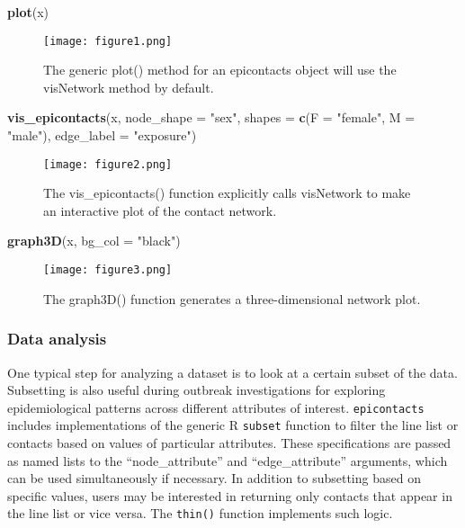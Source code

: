 \documentclass[9pt,a4paper,]{extarticle}
\newenvironment{Shaded}{\begin{snugshade}}{\end{snugshade}}
\newcommand{\KeywordTok}[1]{\textcolor[rgb]{0.13,0.29,0.53}{\textbf{#1}}}
\newcommand{\DataTypeTok}[1]{\textcolor[rgb]{0.13,0.29,0.53}{#1}}
\newcommand{\StringTok}[1]{\textcolor[rgb]{0.31,0.60,0.02}{#1}}
\newcommand{\NormalTok}[1]{#1}
\theoremstyle{definition}
\theoremstyle{definition}
\theoremstyle{definition}
\theoremstyle{remark}
\begin{document}
\begin{Shaded}
\begin{Highlighting}[]
\KeywordTok{plot}\NormalTok{(x)}
\end{Highlighting}
\end{Shaded}

\begin{figure}
\centering
\texttt{[image: figure1.png]}
\caption{The generic plot() method for an epicontacts object will use the visNetwork method by default.}
\end{figure}

\begin{Shaded}
\begin{Highlighting}[]
\KeywordTok{vis_epicontacts}\NormalTok{(x,}
                \DataTypeTok{node_shape =} \StringTok{"sex"}\NormalTok{,}
                \DataTypeTok{shapes =} \KeywordTok{c}\NormalTok{(}\DataTypeTok{F =} \StringTok{"female"}\NormalTok{, }\DataTypeTok{M =} \StringTok{"male"}\NormalTok{),}
                \DataTypeTok{edge_label =} \StringTok{"exposure"}\NormalTok{)}
\end{Highlighting}
\end{Shaded}

\begin{figure}
\centering
\texttt{[image: figure2.png]}
\caption{The vis\_epicontacts() function explicitly calls visNetwork to make an interactive plot of the contact network.}
\end{figure}

\begin{Shaded}
\begin{Highlighting}[]
\KeywordTok{graph3D}\NormalTok{(x, }\DataTypeTok{bg_col =} \StringTok{"black"}\NormalTok{)}
\end{Highlighting}
\end{Shaded}

\begin{figure}
\centering
\texttt{[image: figure3.png]}
\caption{The graph3D() function generates a three-dimensional network plot.}
\end{figure}

\subsubsection{Data analysis}\label{data-analysis}

One typical step for analyzing a dataset is to look at a certain subset of the data. Subsetting is also useful during outbreak investigations for exploring epidemiological patterns across different attributes of interest. \texttt{epicontacts} includes implementations of the generic R \texttt{subset} function to filter the line list or contacts based on values of particular attributes. These specifications are passed as named lists to the ``node\_attribute'' and ``edge\_attribute'' arguments, which can be used simultaneously if necessary. In addition to subsetting based on specific values, users may be interested in returning only contacts that appear in the line list or vice versa. The \texttt{thin()} function implements such logic.
\end{document}
